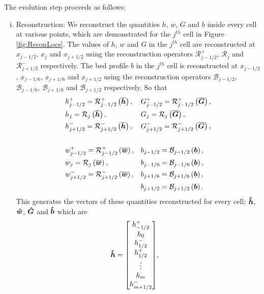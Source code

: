 The evolution step proceeds as follows:
\begin{enumerate}[(i)]
	\item Reconstruction: We reconstruct the quantities $h$, $w$, $G$ and $b$ inside every cell at various points, which are demonstrated for the $j^{th}$ cell in Figure \ref{fig:ReconLocs}. The values of $h$, $w$ and $G$ in the $j^{th}$ cell are reconstructed at $x_{j-1/2}$, $x_{j}$ and $x_{j+1/2}$ using the reconstruction operators $\mathcal{R}^+_{j-1/2}$, $\mathcal{R}_{j}$ and $\mathcal{R}^-_{j+1/2}$ respectively. The bed profile $b$ in the $j^{th}$ cell is reconstructed at $x_{j-1/2}$, $x_{j-1/6}$, $x_{j+1/6}$ and $x_{j+1/2}$ using the reconstruction operators $\mathcal{B}_{j-1/2}$, $\mathcal{B}_{j-1/6}$, $\mathcal{B}_{j+1/6}$ and $\mathcal{B}_{j+1/2}$ respectively. So that
	\begin{align*}	&h^+_{j-1/2} = \mathcal{R}^+_{j-1/2} \left(\overline{\boldsymbol{h}}\right),&& G^+_{j-1/2} = \mathcal{R}^+_{j-1/2} \left(\overline{\boldsymbol{G}}\right),\\
	&h_j = \mathcal{R}_{j} \left(\overline{\boldsymbol{h}}\right),&& G_j = \mathcal{R}_{j} \left(\overline{\boldsymbol{G}}\right),\\
	&h^-_{j+1/2} = \mathcal{R}^-_{j+1/2}\left(\overline{\boldsymbol{h}}\right),&& G^-_{j+1/2} = \mathcal{R}^-_{j+1/2} \left(\overline{\boldsymbol{G}}\right),\\ \\
	&w^+_{j-1/2} = \mathcal{R}^+_{j-1/2} \left(\overline{\boldsymbol{w}}\right), &&b_{j-1/2} = \mathcal{B}_{j-1/2} \left(\boldsymbol{b}\right),  \\
	&w_{j} = \mathcal{R}_{j} \left(\overline{\boldsymbol{w}}\right), &&b_{j-1/6} = \mathcal{B}_{j-1/6}  \left(\boldsymbol{b}\right),\\
	&w^-_{j+1/2} = \mathcal{R}^-_{j+1/2} \left(\overline{\boldsymbol{w}}\right), &&b_{j+1/6} = \mathcal{B}_{j+1/6} \left(\boldsymbol{b}\right), \\
	& && b_{j+1/2} = \mathcal{B}_{j+1/2}  \left(\boldsymbol{b}\right).\\
	\end{align*}
	This generates the vectors of these quantities reconstructed for every cell; $\boldsymbol{\hat{h}}$, $\boldsymbol{\hat{w}}$, $\boldsymbol{\hat{G}}$ and $\boldsymbol{\hat{b}}$ which are
	\begin{align*}\vecn{\hat{h}} = \begin{bmatrix}
	h^+_{-1/2} \\ h_0 \\ h^-_{1/2} \\ h^+_{1/2}  \\ \vdots \\ h_m \\ h^-_{m+1/2}\end{bmatrix} &,&

\end{align*}
\end{enumerate}
